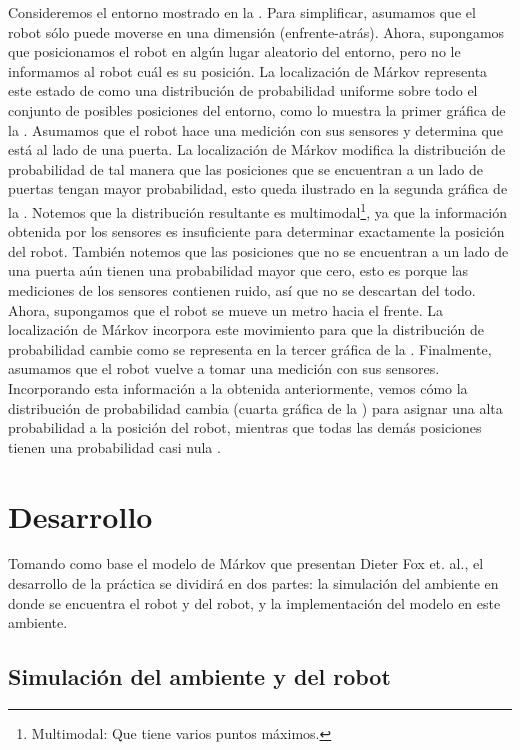 Consideremos el entorno mostrado en la . Para simplificar, asumamos que el robot sólo puede moverse en una dimensión (enfrente-atrás). Ahora, supongamos que posicionamos el robot en algún lugar aleatorio del entorno, pero no le informamos al robot cuál es su posición. La localización de Márkov representa este estado de  como una distribución de probabilidad uniforme sobre todo el conjunto de posibles posiciones del entorno, como lo muestra la primer gráfica de la . Asumamos que el robot hace una medición con sus sensores y determina que está al lado de una puerta. La localización de Márkov modifica la distribución de probabilidad de tal manera que las posiciones que se encuentran a un lado de puertas tengan mayor probabilidad, esto queda ilustrado en la segunda gráfica de la . Notemos que la distribución resultante es multimodal\footnote{Multimodal: Que tiene varios puntos máximos.}, ya que la información obtenida por los sensores es insuficiente para determinar exactamente la posición del robot. También notemos que las posiciones que no se encuentran a un lado de una puerta aún tienen una probabilidad mayor que cero, esto es porque las mediciones de los sensores contienen ruido, así que no se descartan del todo. Ahora, supongamos que el robot se mueve un metro hacia el frente. La localización de Márkov incorpora este movimiento para que la distribución de probabilidad cambie como se representa en la tercer gráfica de la . Finalmente, asumamos que el robot vuelve a tomar una medición con sus sensores. Incorporando esta información a la obtenida anteriormente, vemos cómo la distribución de probabilidad cambia (cuarta gráfica de la ) para asignar una alta probabilidad a la posición del robot, mientras que todas las demás posiciones tienen una probabilidad casi nula \parencite{Dieter1999}.

\section{Desarrollo}

Tomando como base el modelo de Márkov que presentan Dieter Fox et. al., el desarrollo de la práctica se dividirá en dos partes: la simulación del ambiente en donde se encuentra el robot y del robot, y la implementación del modelo en este ambiente.

\subsection{Simulación del ambiente y del robot}

